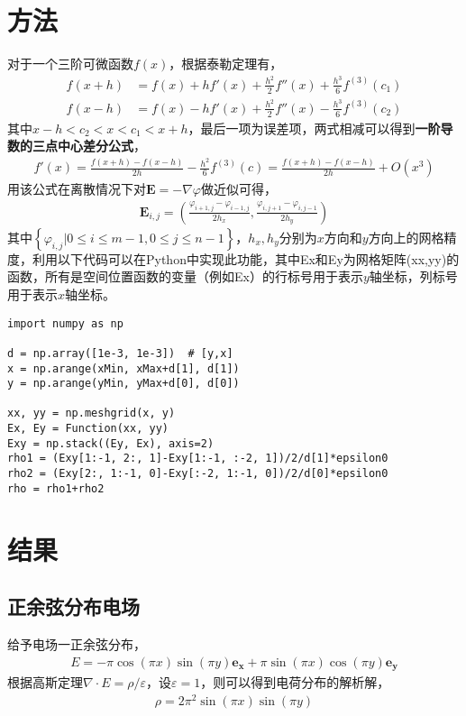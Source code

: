 \documentclass{article} %
\renewcommand{\vec}[1]{\boldsymbol{#1}} %
\begin{document}
\section{方法}
对于一个三阶可微函数$f(x)$，根据泰勒定理有，
\begin{align}
    f(x+h) & =f(x)+hf'(x)+\frac{h^2}{2}f''(x)+\frac{h^3}{6}f^{(3)}(c_1) \\
    f(x-h) & =f(x)-hf'(x)+\frac{h^2}{2}f''(x)-\frac{h^3}{6}f^{(3)}(c_2)
\end{align}
其中$x-h<c_2<x<c_1<x+h$，最后一项为误差项，两式相减可以得到\textbf{一阶导数的三点中心差分公式}，
\begin{align}
    f'(x)=\frac{f(x+h)-f(x-h)}{2h}-\frac{h^2}{6}f^{(3)}(c)=\frac{f(x+h)-f(x-h)}{2h}+O(x^3)
\end{align}
用该公式在离散情况下对$\vec{E}=-\nabla \varphi$做近似可得，
\begin{align}
    \vec{E}_{i,j}=\left(\frac{\varphi_{i+1,j}-\varphi_{i-1,j}}{2h_x},\frac{\varphi_{i,j+1}-\varphi_{i,j-1}}{2h_y}\right)
\end{align}
其中$\left\{\varphi_{i,j}|0\leq i\leq m-1,0\leq j\leq n-1\right\}$，$h_x,h_y$分别为$x$方向和$y$方向上的网格精度，利用以下代码可以在Python中实现此功能，其中Ex和Ey为网格矩阵(xx,yy)的函数，所有是空间位置函数的变量（例如Ex）的行标号用于表示$y$轴坐标，列标号用于表示$x$轴坐标。
\begin{lstlisting}
import numpy as np

d = np.array([1e-3, 1e-3])  # [y,x]
x = np.arange(xMin, xMax+d[1], d[1])
y = np.arange(yMin, yMax+d[0], d[0])

xx, yy = np.meshgrid(x, y)
Ex, Ey = Function(xx, yy)
Exy = np.stack((Ey, Ex), axis=2)
rho1 = (Exy[1:-1, 2:, 1]-Exy[1:-1, :-2, 1])/2/d[1]*epsilon0
rho2 = (Exy[2:, 1:-1, 0]-Exy[:-2, 1:-1, 0])/2/d[0]*epsilon0
rho = rho1+rho2
\end{lstlisting}

\section{结果}
\subsection{正余弦分布电场}
给予电场一正余弦分布，
\begin{align}
    E=-\pi\cos(\pi x)\sin(\pi y)\vec{e_x}+\pi\sin(\pi x)\cos(\pi y)\vec{e_y}
\end{align}
根据高斯定理$\nabla \cdot E = \rho / \varepsilon$，设$\varepsilon=1$，则可以得到电荷分布的解析解，
\begin{align}
    \rho=2\pi^2 \sin(\pi x)\sin(\pi y)
\end{align}
\end{document}
